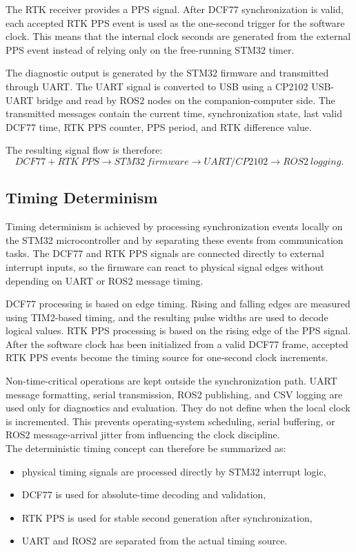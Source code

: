 The RTK receiver provides a PPS signal. After DCF77 synchronization is valid, each accepted RTK PPS event is used as the one-second trigger for the software clock. This means that the internal clock seconds are generated from the external PPS event instead of relying only on the free-running STM32 timer.

The diagnostic output is generated by the STM32 firmware and transmitted through UART. The UART signal is converted to USB using a CP2102 USB-UART bridge and read by ROS2 nodes on the companion-computer side. The transmitted messages contain the current time, synchronization state, last valid DCF77 time, RTK PPS counter, PPS period, and RTK difference value.

The resulting signal flow is therefore:
\begin{equation}
DCF77 + RTK~PPS \rightarrow STM32~firmware \rightarrow UART/CP2102 \rightarrow ROS2~logging.
\end{equation}

\subsection{Timing Determinism}

Timing determinism is achieved by processing synchronization events locally on the STM32 microcontroller and by separating these events from communication tasks. The DCF77 and RTK PPS signals are connected directly to external interrupt inputs, so the firmware can react to physical signal edges without depending on UART or ROS2 message timing.

DCF77 processing is based on edge timing. Rising and falling edges are measured using TIM2-based timing, and the resulting pulse widths are used to decode logical values. RTK PPS processing is based on the rising edge of the PPS signal. After the software clock has been initialized from a valid DCF77 frame, accepted RTK PPS events become the timing source for one-second clock increments.

Non-time-critical operations are kept outside the synchronization path. UART message formatting, serial transmission, ROS2 publishing, and CSV logging are used only for diagnostics and evaluation. They do not define when the local clock is incremented. This prevents operating-system scheduling, serial buffering, or ROS2 message-arrival jitter from influencing the clock discipline.
\\
The deterministic timing concept can therefore be summarized as:
\begin{itemize}
    \item physical timing signals are processed directly by STM32 interrupt logic,
    \item DCF77 is used for absolute-time decoding and validation,
    \item RTK PPS is used for stable second generation after synchronization,
    \item UART and ROS2 are separated from the actual timing source.
\end{itemize}

